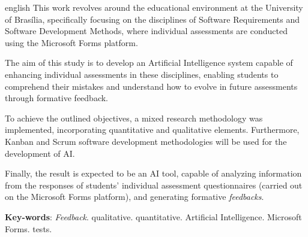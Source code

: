 \begin{resumo}[Abstract]
 \begin{otherlanguage*}{english}
   This work revolves around the educational environment at the University of Brasília, specifically focusing on the disciplines of Software Requirements and Software Development Methods, where individual assessments are conducted using the Microsoft Forms platform.

    The aim of this study is to develop an Artificial Intelligence system capable of enhancing individual assessments in these disciplines, enabling students to comprehend their mistakes and understand how to evolve in future assessments through formative feedback.

    To achieve the outlined objectives, a mixed research methodology was implemented, incorporating quantitative and qualitative elements. Furthermore, Kanban and Scrum software development methodologies will be used for the development of AI.

    Finally, the result is expected to be an AI tool, capable of analyzing information from the responses of students' individual assessment questionnaires (carried out on the Microsoft Forms platform), and generating formative \textit{feedbacks}.
   \vspace{\onelineskip}
 
   \noindent 
   \textbf{Key-words}: \textit{Feedback}. qualitative. quantitative. Artificial Intelligence. Microsoft Forms. tests. 
 \end{otherlanguage*}
\end{resumo}
